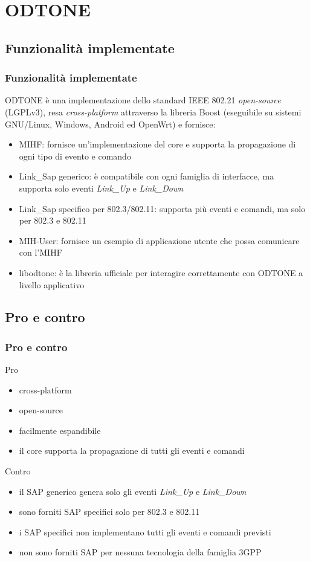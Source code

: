 \documentclass[10pt]{beamer}
\begin{document}
\section{ODTONE}
\subsection{Funzionalità implementate}
\begin{frame}
\frametitle{Funzionalità implementate}
ODTONE è una implementazione dello standard IEEE 802.21 {\em open-source} (LGPLv3), resa {\em cross-platform} attraverso la libreria Boost (eseguibile su sistemi GNU/Linux, Windows, Android ed OpenWrt) e fornisce:

\begin{itemize}

\item MIHF: fornisce un'implementazione del core e supporta la propagazione di ogni tipo di evento e comando
\item Link\_Sap generico: è compatibile con ogni famiglia di interfacce, ma supporta solo eventi {\em Link\_Up} e {\em Link\_Down}
\item Link\_Sap specifico per 802.3/802.11: supporta più eventi e comandi, ma solo per 802.3 e 802.11
\item MIH-User: fornisce un esempio di applicazione utente che possa comunicare con l'MIHF
\item libodtone: è la libreria ufficiale per interagire correttamente con ODTONE a livello applicativo
\end{itemize}


\end{frame}
\subsection{Pro e contro}
\begin{frame}
\frametitle{Pro e contro}
\begin{block}{Pro}

\begin{itemize}
\item cross-platform
\item open-source
\item facilmente espandibile
\item il core supporta la propagazione di tutti gli eventi e comandi
\end{itemize}
\end{block}

\begin{block}{Contro}
\begin{itemize}
\item il SAP generico genera solo gli eventi {\em Link\_Up} e {\em Link\_Down}
\item sono forniti SAP specifici solo per 802.3 e 802.11
\item i SAP specifici non implementano tutti gli eventi e comandi previsti
\item non sono forniti SAP per nessuna tecnologia della famiglia 3GPP
\end{itemize}
\end{block}
\end{frame}
\end{document}
